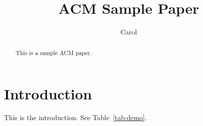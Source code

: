 \documentclass[sigconf]{acmart}
\title{ACM Sample Paper}
\author{Carol}
\begin{document}
\begin{abstract}
This is a sample ACM paper.
\end{abstract}
\maketitle
\section{Introduction}
This is the introduction. See Table~\ref{tab:demo}. \cite{ref1}
\begin{table}[tbp]
\caption{Demo table}
\label{tab:demo}
\end{table}

\end{document}
